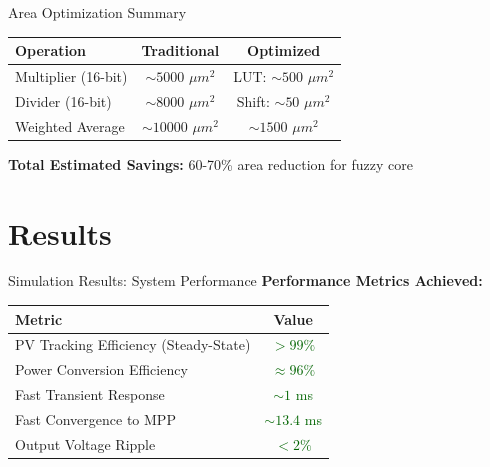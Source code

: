 \documentclass[aspectratio=169,usenames,dvipsnames]{beamer}
\begin{document}
\begin{frame}{Area Optimization Summary}
    \begin{table}
        \centering
        \footnotesize
        \begin{tabular}{|l|c|c|}
            \hline
            \textbf{Operation} & \textbf{Traditional} & \textbf{Optimized} \\
            \hline
            Multiplier (16-bit) & $\sim 5000$ $\mu m^2$ & LUT: $\sim 500$ $\mu m^2$ \\
            \hline
            Divider (16-bit) & $\sim 8000$ $\mu m^2$ & Shift: $\sim 50$ $\mu m^2$ \\
            \hline
            Weighted Average & $\sim 10000$ $\mu m^2$ & $\sim 1500$ $\mu m^2$ \\
            \hline
        \end{tabular}
    \end{table}
    
    \vspace{0.3cm}
    \textbf{Total Estimated Savings:} 60-70\% area reduction for fuzzy core
\end{frame}

\section{Results}

\begin{frame}{Simulation Results: System Performance}
    \textbf{Performance Metrics Achieved:}
    
    \vspace{0.3cm}
    \begin{table}
        \centering
        \large
        \begin{tabular}{|l|c|}
            \hline
            \textbf{Metric} & \textbf{Value} \\
            \hline
            PV Tracking Efficiency (Steady-State) & \textcolor{darkgreen}{$> 99\%$} \\
            \hline
            Power Conversion Efficiency & \textcolor{darkgreen}{$\approx 96\%$} \\
            \hline
            Fast Transient Response & \textcolor{darkgreen}{$\sim 1$ ms} \\
            \hline
            Fast Convergence to MPP & \textcolor{darkgreen}{$\sim 13.4$ ms} \\
            \hline
            Output Voltage Ripple & \textcolor{darkgreen}{$< 2\%$} \\
            \hline
        \end{tabular}
    \end{table}
\end{frame}
\end{document}
